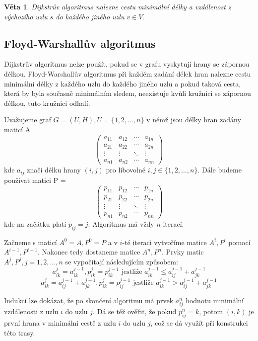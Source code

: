 \documentclass[a4paper, 11pt]{report}
\newtheorem{veta}{Věta}[chapter]
\begin{document}
\begin{veta}
Dijkstrův algoritmus nalezne cestu minimální délky a vzdálenost z výchozího uzlu $s$ do každého jiného uzlu $v \in V$.
\end{veta}

\subsection{Floyd-Warshallův algoritmus}
Dijkstrův algoritmus nelze použít, pokud se v grafu vyskytují hrany se zápornou délkou. Floyd-Warshallův algoritmus při každém zadání délek hran nalezne cestu minimální délky z každého uzlu do každého jiného uzlu a pokud taková cesta, která by byla současně minimálním sledem, neexistuje kvůli kružnici se zápornou délkou, tuto kružnici odhalí.

Uvažujeme graf $G = (U, H), U = \{1, 2, \dots, n\}$ v němž jsou délky hran zadány maticí
A = $$
 \begin{pmatrix}
  a_{11} & a_{12} & \cdots & a_{1n} \\
  a_{21} & a_{22} & \cdots & a_{2n} \\
  \vdots & \vdots & \ddots & \vdots \\
  a_{n1} & a_{n2} & \cdots & a_{nn}
 \end{pmatrix}
$$
kde $a_{ij}$ značí délku hrany $(i, j)$ pro libovolné $i, j \in \{1, 2, \dots, n\}$. Dále budeme používat matici
P = $$
 \begin{pmatrix}
  p_{11} & p_{12} & \cdots & p_{1n} \\
  p_{21} & p_{22} & \cdots & p_{2n} \\
  \vdots & \vdots & \ddots & \vdots \\
  p_{n1} & p_{n2} & \cdots & p_{nn}
 \end{pmatrix}
$$
kde na začátku platí $p_{ij} = j$. Algoritmus má vždy $n$ iterací.

Začneme s maticí $A^0 = A, P^0 = P$ a v $i$-té iteraci vytvoříme matice $A^i, P^i$ pomocí $A^{i-1}, P^{i-1}$. Nakonec tedy dostaneme matice $A^n, P^n$. Prvky matic $A^j, P^j, j = 1, 2, \dots, n$ se vypočítají následujícím způsobem:
$$a_{ik}^j = a_{ik}^{j-1}, p_{ik}^j = p_{ik}^{j-1} \text{ jestliže } a_{ik}^{j-1} \leq a_{ij}^{j-1} + a_{jk}^{j-1}$$
$$a_{ik}^j = a_{ij}^{j-1} + a_{jk}^{j-1}, p_{ik}^j = p_{ij}^{j-1} \text{ jestliže } a_{ik}^{j-1} > a_{ij}^{j-1} + a_{jk}^{j-1}$$

Indukcí lze dokázat, že po skončení algoritmu má prvek $a_{ij}^n$ hodnotu minimální vzdálenosti z uzlu $i$ do uzlu $j$. Dá se též ověřit, že pokud $p_{ij}^n = k$, potom $(i,k)$ je první hrana v minimální cestě z uzlu $i$ do uzlu $j$, což se dá využít při konstrukci této trasy.
\end{document}
